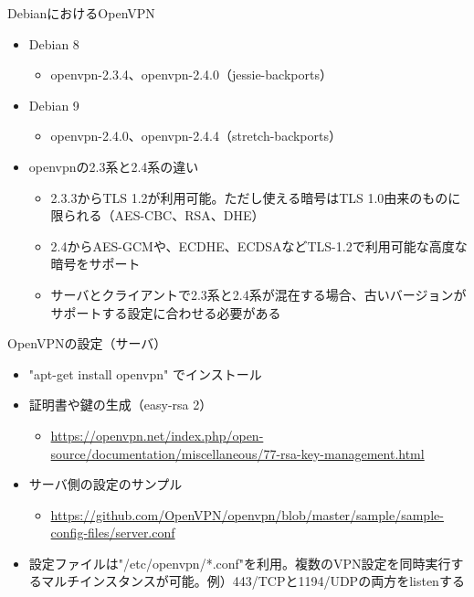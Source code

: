 \begin{frame}[containsverbatim]{DebianにおけるOpenVPN}
  \begin{itemize}
  \item Debian 8
    \begin{itemize}
    \item openvpn-2.3.4、openvpn-2.4.0（jessie-backports）
    \end{itemize}
  \item Debian 9 
    \begin{itemize}
    \item openvpn-2.4.0、openvpn-2.4.4（stretch-backports）
    \end{itemize}
  \item openvpnの2.3系と2.4系の違い
    \begin{itemize}
    \item 2.3.3からTLS 1.2が利用可能。ただし使える暗号はTLS 1.0由来のものに限られる（AES-CBC、RSA、DHE）
    \item 2.4からAES-GCMや、ECDHE、ECDSAなどTLS-1.2で利用可能な高度な暗号をサポート
    \item サーバとクライアントで2.3系と2.4系が混在する場合、古いバージョンがサポートする設定に合わせる必要がある
    \end{itemize}
  \end{itemize}
\end{frame}



\begin{frame}[containsverbatim]{OpenVPNの設定（サーバ）}
  \begin{itemize}
  \item "apt-get install openvpn" でインストール
  \item 証明書や鍵の生成（easy-rsa 2）
  \begin{itemize}
  \item \url{https://openvpn.net/index.php/open-source/documentation/miscellaneous/77-rsa-key-management.html}
  \end{itemize}
  \item サーバ側の設定のサンプル
    \begin{itemize}
    \item \url{https://github.com/OpenVPN/openvpn/blob/master/sample/sample-config-files/server.conf}
  \end{itemize}
  \item 設定ファイルは"/etc/openvpn/*.conf"を利用。複数のVPN設定を同時実行するマルチインスタンスが可能。例）443/TCPと1194/UDPの両方をlistenする
  \end{itemize}
\end{frame}

